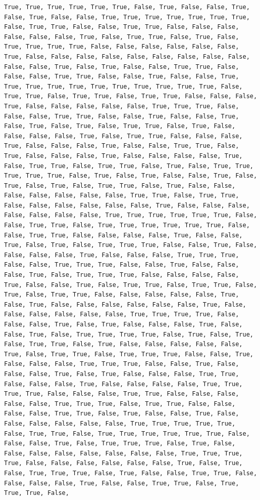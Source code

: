 \documentclass[
  letterpaper,
  DIV=11,
  numbers=noendperiod]{scrartcl}
\begin{document}
\begin{verbatim}
True, True, True, True, True, True, False, True, False, False, True, False, True, False, False, True, True, True, True, True, True, True, False, True, True, False, False, True, True, False, False, False, False, False, False, True, False, True, True, False, True, False, True, True, True, True, False, False, False, False, False, False, True, False, False, False, False, False, False, False, False, False, False, False, True, False, True, False, False, True, True, False, False, False, True, True, False, False, True, False, False, True, True, True, True, True, True, True, True, True, True, True, False, True, True, False, True, True, False, True, True, False, False, False, True, False, False, False, False, False, True, True, True, False, False, False, True, True, False, False, True, False, False, True, False, True, False, True, False, True, True, False, True, False, False, False, False, True, False, True, True, False, False, False, True, False, False, False, True, False, False, True, True, False, True, False, False, False, True, False, False, False, False, True, False, True, True, False, True, True, False, True, False, True, True, True, True, True, False, True, False, True, False, False, True, False, True, False, True, False, True, True, False, True, False, False, False, False, False, False, False, True, True, False, True, True, False, False, False, False, False, False, True, False, False, False, False, False, False, False, True, True, True, True, True, True, False, False, True, True, False, True, True, True, True, True, True, False, False, True, True, False, False, False, False, True, False, False, True, False, True, False, True, True, True, False, False, True, False, False, False, False, True, False, False, False, True, True, True, False, False, True, True, True, False, False, True, False, False, False, True, False, True, True, True, False, False, False, False, True, False, False, True, False, True, True, False, True, True, False, True, False, True, True, False, False, False, False, False, True, False, True, False, False, False, False, False, False, True, False, False, False, False, False, False, True, True, True, True, False, False, False, True, False, True, False, False, False, True, False, False, True, False, True, True, True, True, False, True, False, True, False, True, True, False, True, False, False, False, False, False, True, False, True, True, False, True, True, True, False, False, True, False, False, False, True, True, True, False, False, True, False, False, False, True, False, True, False, False, False, True, True, False, False, False, True, False, False, False, False, True, True, True, True, False, False, False, True, True, False, False, False, False, False, True, True, True, False, True, True, False, False, False, False, True, True, False, True, False, False, True, False, False, False, False, False, False, True, True, True, True, True, False, True, True, False, True, True, True, True, True, True, False, False, False, True, False, True, True, True, False, True, False, False, False, False, False, False, False, False, True, True, True, True, False, False, False, False, False, False, True, False, True, False, True, True, True, False, True, False, False, True, True, False, False, False, False, True, False, False, True, True, False, True, True, True, False, 
\end{verbatim}
\end{document}
